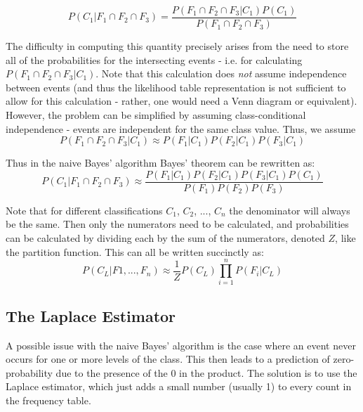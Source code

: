 \documentclass[]{article}
\begin{document}
$$
P(C_1|F_1 \cap F_2 \cap F_3) = \frac{P(F_1 \cap F_2 \cap F_3|C_1)P(C_1)}{P(F_1 \cap F_2 \cap F_3)}
$$

The difficulty in computing this quantity precisely arises from the need to store all of the probabilities for the intersecting events - i.e. for calculating $P(F_1 \cap F_2 \cap F_3|C_1)$.  Note that this calculation does \emph{not} assume independence between events (and thus the likelihood table representation is not sufficient to allow for this calculation - rather, one would need a Venn diagram or equivalent).  However, the problem can be simplified by assuming class-conditional independence - events are independent for the same class value.  Thus, we assume 
$$
P(F_1 \cap F_2 \cap F_3|C_1) \approx P(F_1|C_1)P(F_2|C_1)P(F_3|C_1)
$$

Thus in the naive Bayes' algorithm Bayes' theorem can be rewritten as:
$$
P(C_1|F_1 \cap F_2 \cap F_3) \approx \frac{P(F_1|C_1)P(F_2|C_1)P(F_3|C_1)P(C_1)}{P(F_1)P(F_2)P(F_3)}
$$

Note that for different classifications $C_1$, $C_2$, ..., $C_n$ the denominator will always be the same.  Then only the numerators need to be calculated, and probabilities can be calculated by dividing each by the sum of the numerators, denoted $Z$, like the partition function.  This can all be written succinctly as:
$$
P(C_L|F1,...,F_n) \approx \frac{1}{Z}P(C_L)\prod_{i=1}^{n}P(F_i|C_L)
$$

\subsection{The Laplace Estimator}

A possible issue with the naive Bayes' algorithm is the case where an event never occurs for one or more levels of the class. This then leads to a prediction of zero-probability due to the presence of the 0 in the product. The solution is to use the Laplace estimator, which just adds a small number (usually 1) to every count in the frequency table.
\end{document}
